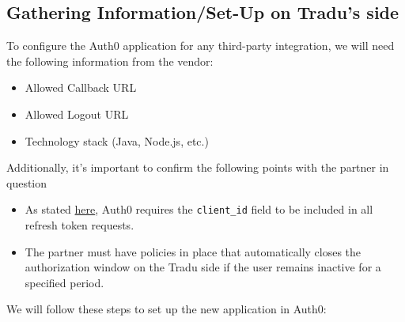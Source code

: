 \documentclass[11pt]{article}
\begin{document}
\subsection{Gathering Information/Set-Up on Tradu's side}

To configure the Auth0 application for any third-party integration, we will need the following information from the vendor:

\begin{itemize}
    \item Allowed Callback URL
    \item Allowed Logout URL
    \item Technology stack (Java, Node.js, etc.)
\end{itemize}

Additionally, it’s important to confirm the following points with the partner in question

\begin{itemize}
    \item As stated \href{https://auth0.com/docs/api/authentication#refresh-token}{here}, Auth0 requires the \verb|client_id| field to be included in all refresh token requests.
    \item The partner must have policies in place that automatically closes the authorization window on the Tradu side if the user remains inactive for a specified period.
\end{itemize}

We will follow these steps to set up the new application in Auth0:
\end{document}
